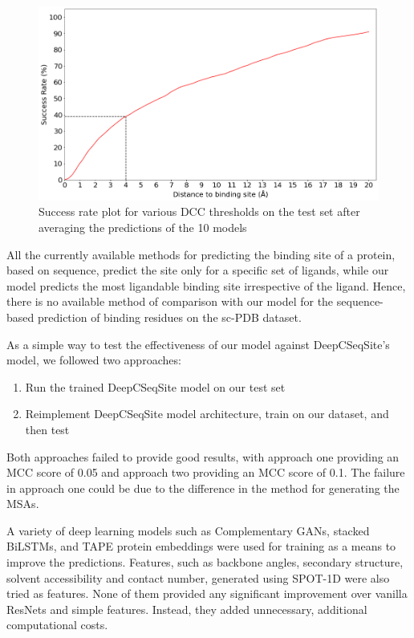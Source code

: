 \documentclass[journal=jacsat,manuscript=article]{achemso}
\begin{document}
\begin{figure}
    \centering
    \noindent\includegraphics[scale=0.45]{test_dcc.png}
    \caption{\centering Success rate plot for various DCC thresholds on the test set after averaging the predictions of the 10 models}
    \label{fig:test_dcc}
\end{figure}

All the currently available methods for predicting the binding site of a protein, based on sequence, predict the site only for a specific set of ligands, while our model predicts the most ligandable binding site irrespective of the ligand. Hence, there is no available method of comparison with our model for the sequence-based prediction of binding residues on the sc-PDB\cite{desaphy2015sc} dataset.

As a simple way to test the effectiveness of our model against DeepCSeqSite's model, we followed two approaches:
\begin{enumerate}
    \item Run the trained DeepCSeqSite model on our test set
    \item Reimplement DeepCSeqSite model architecture, train on our dataset, and then test
\end{enumerate}

Both approaches failed to provide good results, with approach one providing an MCC score of 0.05 and approach two providing an MCC score of 0.1. The failure in approach one could be due to the difference in the method for generating the MSAs.

A variety of deep learning models such as Complementary GANs, stacked BiLSTMs, and TAPE protein embeddings were used for training as a means to improve the predictions. Features, such as backbone angles, secondary structure, solvent accessibility and contact number, generated using SPOT-1D \cite{hanson2018accurate} were also tried as features. None of them provided any significant improvement over vanilla ResNets and simple features. Instead, they added unnecessary, additional computational costs.
\end{document}
